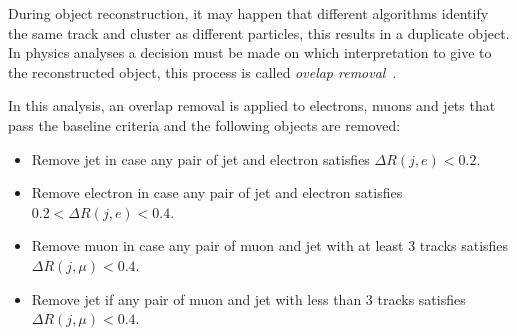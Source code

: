 During object reconstruction, it may happen that different algorithms identify
the same track and cluster as different particles, this results in a duplicate
object. In physics analyses a decision must be made on which interpretation to
give to the reconstructed object, this process is called \emph{ovelap
  removal}~\cite{Alison:1536507}.

In this analysis, an overlap removal is applied to electrons, muons and jets
that pass the baseline criteria and the following objects are removed:
\begin{itemize}
\item Remove jet in case any pair of jet and electron satisfies $\Delta R(j,
  e) < 0.2$.
\item Remove electron in case any pair of jet and electron satisfies $0.2 <
  \Delta R(j, e) < 0.4$.
\item Remove muon in case any pair of muon and jet with at least 3 tracks
  satisfies $\Delta R(j, \mu) < 0.4$.
\item Remove jet if any pair of muon and jet with less than 3 tracks satisfies
  $\Delta R(j, \mu) < 0.4$.
\end{itemize}
